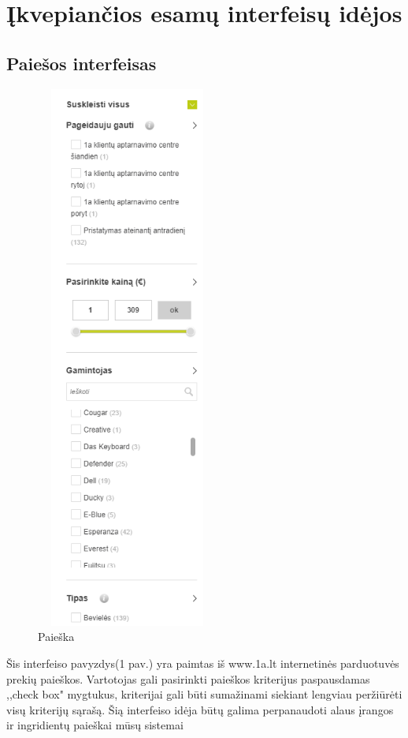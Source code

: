\documentclass[oneside]{VUMIFPSkursinis}
\begin{document}
\section{Įkvepiančios esamų interfeisų idėjos}
  		
	\subsection{Paiešos interfeisas}
		\begin{figure}[h]
			\centering
			\includegraphics[width=6cm,height=18cm,keepaspectratio]{IkvepiantisInterfeisas1.png}
			\caption{ Paieška}
		\end{figure}

			Šis interfeiso pavyzdys(1 pav.) yra paimtas iš www.1a.lt internetinės parduotuvės prekių paieškos. 
			Vartotojas gali pasirinkti paieškos kriterijus paspausdamas ,,check box" mygtukus, kriterijai gali būti sumažinami siekiant lengviau peržiūrėti visų kriterijų sąrašą. 
			Šią interfeiso idėja būtų galima perpanaudoti alaus įrangos ir ingridientų paieškai mūsų sistemai
	\pagebreak
\end{document}
